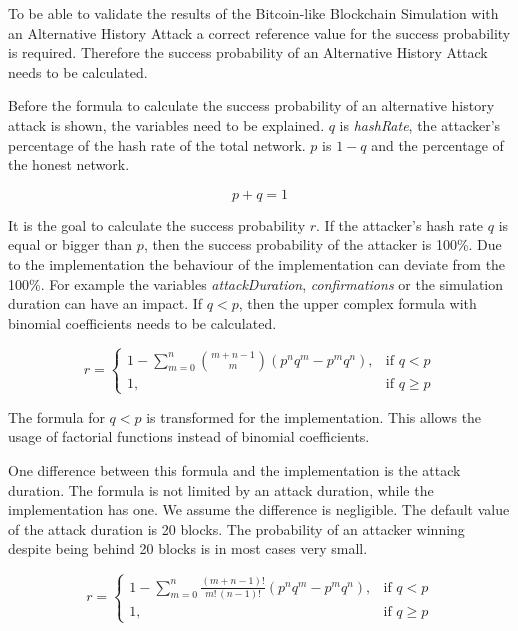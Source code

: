 To be able to validate the results of the Bitcoin-like Blockchain Simulation with an Alternative History Attack a correct reference value for the success probability is required. Therefore the success probability of an Alternative History Attack needs to be calculated.

Before the formula to calculate the success probability of an alternative history attack is shown, the variables need to be explained.
$q$ is \textit{hashRate}, the attacker's percentage of the hash rate of the total network. $p$ is $1-q$ and the percentage of the honest network.

\begin{equation}
p + q = 1
\end{equation}

It is the goal to calculate the success probability $r$. If the attacker's hash rate $q$ is equal or bigger than $p$, then the success probability of the attacker is 100\%.
Due to the implementation the behaviour of the implementation can deviate from the 100\%. For example the variables \textit{attackDuration}, \textit{confirmations} or the simulation duration can have an impact.
If $q < p$, then the upper complex formula with binomial coefficients needs to be calculated.

\begin{equation}
    r = 
\begin{cases}
    1-\sum\limits_{m=0}^n \binom{m+n-1}{m}(p^nq^m-p^mq^n),& \text{if } q < p\\
    1,              & \text{if } q \geq p
\end{cases}
\end{equation}

The formula for $q < p$ is transformed for the implementation. This allows the usage of factorial functions instead of binomial coefficients.

One difference between this formula and the implementation is the attack duration. The formula is not limited by an attack duration, while the implementation has one. We assume the difference is negligible. The default value of the attack duration is 20 blocks. The probability of an attacker winning despite being behind 20 blocks is in most cases very small.

\begin{equation}\label{eq:successProbability}
    r = 
\begin{cases}
    1-\sum\limits_{m=0}^n \frac{(m+n-1)!}{m!\,(n-1)!}(p^nq^m-p^mq^n),& \text{if } q < p\\
    1,              & \text{if } q \geq p
\end{cases}
\end{equation}

